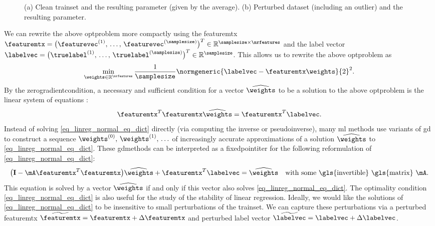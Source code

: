 {{\begin{figure}[H]
{			(a) Clean \gls{trainset} and the resulting \gls{parameter} (given by the average). 
		 	(b) Perturbed \gls{dataset} (including an \gls{outlier}) 
		 	and the resulting \gls{parameter}. \label{fig_linreg_dict}}
		\end{figure}
		We can rewrite the above \gls{optproblem} more compactly using the 
		\gls{featuremtx} $\featuremtx = \big(\featurevec^{(1)},\,\ldots,\,\featurevec^{(\samplesize)}\big)^{T} \in \mathbb{R}^{\samplesize \times \nrfeatures}$ 
		and the \gls{label} \gls{vector} $\labelvec = \big( \truelabel^{(1)},\,\ldots, \,\truelabel^{(\samplesize)} \big)^{T} \in \mathbb{R}^{\samplesize}$. 
		This allows us to rewrite the above \gls{optproblem} as
		$$\min_{\weights \in \mathbb{R}^{\nrfeatures}} \frac{1}{\samplesize} \normgeneric{\labelvec - \featuremtx \weights}{2}^{2}.$$
		By the \gls{zerogradientcondition}, a necessary and sufficient condition for a 
		\gls{vector} $\widehat{\weights}$ to be a solution to the above \gls{optproblem} is the 
		linear system of equations \cite{StrangLinAlg2016}:
		\begin{equation} 
			\label{eq_linreg_normal_eq_dict}
			\featuremtx^{T}\featuremtx \widehat{\weights} = \featuremtx^{T} \labelvec.
		\end{equation}
		Instead of solving \eqref{eq_linreg_normal_eq_dict} directly 
		(via computing the \gls{inverse} or \gls{pseudoinverse}), 
		many \gls{ml} methods use variants of \gls{gd} to construct a \gls{sequence} 
		$\weights^{(0)},\,\weights^{(1)},\,\ldots$ of increasingly accurate approximations 
		of a solution $\widehat{\weights}$ to \eqref{eq_linreg_normal_eq_dict}. These 
		\glspl{gdmethod} can be interpreted as a \gls{fixedpointiter} for the following 
		reformulation of \eqref{eq_linreg_normal_eq_dict}:
		$$ \big(\mathbf{I} - \mA \featuremtx^{T}\featuremtx\big) \widehat{\weights} + \featuremtx^{T} 
		\labelvec = \widehat{\weights} \quad \mbox{with some \gls{invertible} \gls{matrix} } \mA.$$
		This equation is solved by a \gls{vector} $\widehat{\weights}$ if and only if 
		this \gls{vector} also solves \eqref{eq_linreg_normal_eq_dict}. The optimality 
		condition \eqref{eq_linreg_normal_eq_dict} is also useful for the study of 
		the \gls{stability} of linear \gls{regression}. Ideally, we would like the solutions of 
		\eqref{eq_linreg_normal_eq_dict} to be insensitive to small perturbations 
		of the \gls{trainset}. We can capture these perturbations via a 
		perturbed \gls{featuremtx} $\widetilde{\featuremtx} = \featuremtx + \Delta \featuremtx$
		and perturbed \gls{label} 
		\gls{vector} $\widetilde{\labelvec} = \labelvec + \Delta \labelvec$. 
}}
